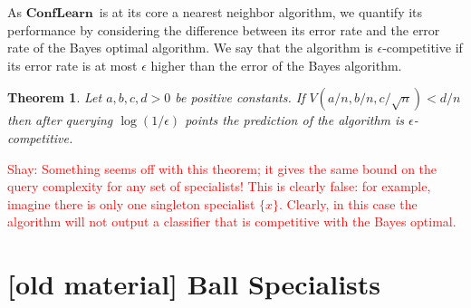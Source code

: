 \documentclass{article}
\newtheorem{theorem}{Theorem}[section]
\newcommand{\new}[1]{\textcolor{red}{#1}}
\newcommand{\ActiveLearn}{$\mathbf{ConfLearn}$}
\begin{document}
As \ActiveLearn\ is at its core a nearest neighbor algorithm, we
quantify its performance by considering the difference between its error
rate and the error rate of the Bayes optimal
algorithm. We say that the algorithm is $\epsilon$-competitive if its
error rate is at most $\epsilon$ higher than the error of the Bayes algorithm.

\begin{theorem}
Let $a,b,c,d>0$ be positive constants. If $V(a/n,b/n,c/\sqrt{n}) <
d/n$ then after querying $\log(1/\epsilon)$ points the prediction of
the algorithm is $\epsilon$-competitive.
\end{theorem}
\new{Shay: Something seems off with this theorem; it gives the same bound on the query complexity for any set of specialists! This is clearly false: for example, imagine there is only one singleton specialist $\{x\}$.
Clearly, in this case the algorithm will not output a classifier that is competitive with the Bayes optimal.}

\section{\color{red} [old material] Ball Specialists}
\end{document}

